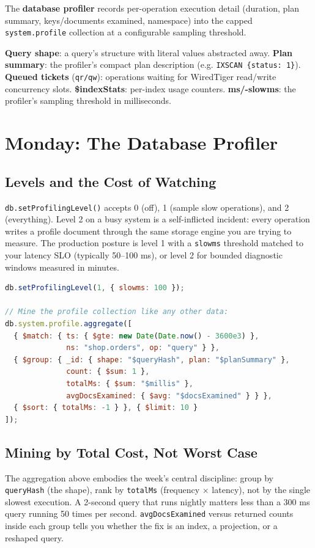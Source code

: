 \begin{definitionbox}
The \textbf{database profiler} records per-operation execution detail (duration, plan summary, keys/documents examined, namespace) into the capped \texttt{system.profile} collection at a configurable sampling threshold.
\end{definitionbox}

\begin{keyterms}
\textbf{Query shape}: a query's structure with literal values abstracted away. \textbf{Plan summary}: the profiler's compact plan description (e.g. \texttt{IXSCAN \{status: 1\}}). \textbf{Queued tickets} (\texttt{qr/qw}): operations waiting for WiredTiger read/write concurrency slots. \textbf{\$indexStats}: per-index usage counters. \textbf{ms/-slowms}: the profiler's sampling threshold in milliseconds.
\end{keyterms}

\section{Monday: The Database Profiler}
\subsection{Levels and the Cost of Watching}
\texttt{db.setProfilingLevel()} accepts 0 (off), 1 (sample slow operations), and 2 (everything). Level 2 on a busy system is a self-inflicted incident: every operation writes a profile document through the same storage engine you are trying to measure. The production posture is level 1 with a \texttt{slowms} threshold matched to your latency SLO (typically 50--100 ms), or level 2 for bounded diagnostic windows measured in minutes.

\begin{lstlisting}[language=JavaScript, caption={Profiling posture: level 1 with a 100 ms threshold.}]
db.setProfilingLevel(1, { slowms: 100 });

// Mine the profile collection like any other data:
db.system.profile.aggregate([
  { $match: { ts: { $gte: new Date(Date.now() - 3600e3) },
              ns: "shop.orders", op: "query" } },
  { $group: { _id: { shape: "$queryHash", plan: "$planSummary" },
              count: { $sum: 1 },
              totalMs: { $sum: "$millis" },
              avgDocsExamined: { $avg: "$docsExamined" } } },
  { $sort: { totalMs: -1 } }, { $limit: 10 }
]);
\end{lstlisting}

\subsection{Mining by Total Cost, Not Worst Case}
The aggregation above embodies the week's central discipline: group by \texttt{queryHash} (the shape), rank by \texttt{totalMs} (frequency $\times$ latency), not by the single slowest execution. A 2-second query that runs nightly matters less than a 300 ms query running 50 times per second. \texttt{avgDocsExamined} versus returned counts inside each group tells you whether the fix is an index, a projection, or a reshaped query.

